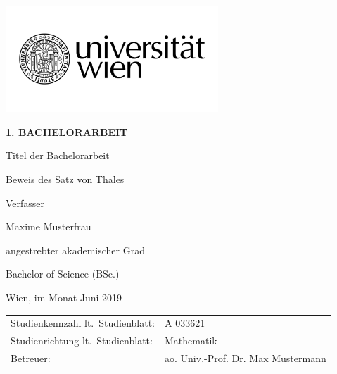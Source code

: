 \begin{titlepage}
\begin{flushright}
    \includegraphics[width=8cm]{Uni_Logo_2016_SW}
\end{flushright}

\begin{center}  %
    \Huge{\textbf{\textsf{\MakeUppercase{
        1. Bachelorarbeit
    }}}}
    \vspace{2cm}

    \large{\textsf{  %
        Titel der Bachelorarbeit
    }}
    \vspace{.1cm}

    \LARGE{\textsf{  Beweis des Satz von Thales
    }}
    \vspace{3cm}

    \large{\textsf{  %
        Verfasser
    }}

    \Large{\textsf{  Maxime Musterfrau
    }}
    \vspace{3cm}

    \large{\textsf{
        angestrebter akademischer Grad  %
    }}

    \Large{\textsf{  %
        Bachelor of Science (BSc.)
    }}
\end{center}
\vspace{2cm}

\noindent\textsf{Wien, im Monat Juni 2019}  %
\vfill

\noindent\begin{tabular}{@{}ll}
\textsf{Studienkennzahl lt.\ Studienblatt:}
&
\textsf{A 033621}  %
\\
\textsf{Studienrichtung lt.\ Studienblatt:}
&
\textsf{Mathematik}  %
\\
\textsf{Betreuer: }
&
\textsf{ao. Univ.-Prof. Dr. Max Mustermann}  %
\end{tabular}

\end{titlepage}
